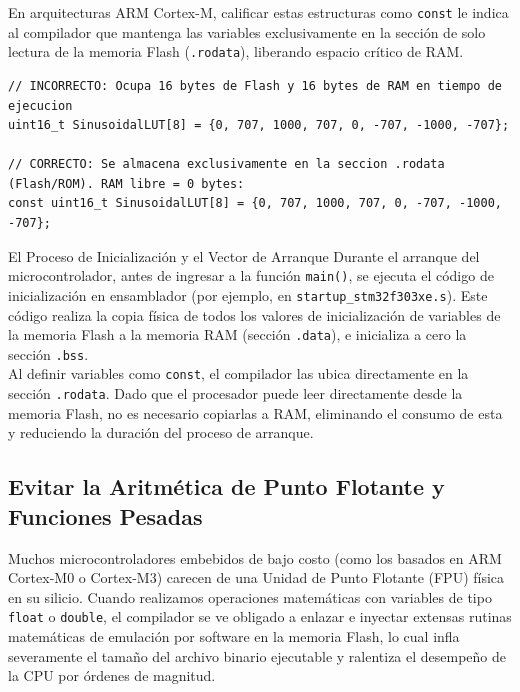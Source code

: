 \documentclass[
10pt, %
a4paper, %
oneside, %
headinclude,footinclude, %
BCOR5mm, %
]{scrartcl}
\begin{document}
En arquitecturas ARM Cortex-M, calificar estas estructuras como \texttt{const} le indica al compilador que mantenga las variables exclusivamente en la sección de solo lectura de la memoria Flash (\texttt{.rodata}), liberando espacio crítico de RAM.

\begin{lstlisting}[style=CMakeStyle]
// INCORRECTO: Ocupa 16 bytes de Flash y 16 bytes de RAM en tiempo de ejecucion
uint16_t SinusoidalLUT[8] = {0, 707, 1000, 707, 0, -707, -1000, -707};

// CORRECTO: Se almacena exclusivamente en la seccion .rodata (Flash/ROM). RAM libre = 0 bytes:
const uint16_t SinusoidalLUT[8] = {0, 707, 1000, 707, 0, -707, -1000, -707};
\end{lstlisting}

\begin{InfoBox}{El Proceso de Inicialización y el Vector de Arranque}
	Durante el arranque del microcontrolador, antes de ingresar a la función \texttt{main()}, se ejecuta el código de inicialización en ensamblador (por ejemplo, en \texttt{startup\_stm32f303xe.s}). Este código realiza la copia física de todos los valores de inicialización de variables de la memoria Flash a la memoria RAM (sección \texttt{.data}), e inicializa a cero la sección \texttt{.bss}. \\
	Al definir variables como \texttt{const}, el compilador las ubica directamente en la sección \texttt{.rodata}. Dado que el procesador puede leer directamente desde la memoria Flash, no es necesario copiarlas a RAM, eliminando el consumo de esta y reduciendo la duración del proceso de arranque.
\end{InfoBox}

\subsection{Evitar la Aritmética de Punto Flotante y Funciones Pesadas}
Muchos microcontroladores embebidos de bajo costo (como los basados en ARM Cortex-M$0$ o Cortex-M3) carecen de una Unidad de Punto Flotante (FPU) física en su silicio. Cuando realizamos operaciones matemáticas con variables de tipo \texttt{float} o \texttt{double}, el compilador se ve obligado a enlazar e inyectar extensas rutinas matemáticas de emulación por software en la memoria Flash, lo cual infla severamente el tamaño del archivo binario ejecutable y ralentiza el desempeño de la CPU por órdenes de magnitud.
\end{document}
